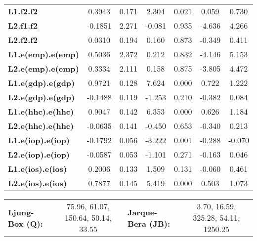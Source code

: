 \begin{center}
\begin{tabular}{lcccccc}
\textbf{L1.f2.f2}         &       0.3943  &        0.171     &     2.304  &         0.021        &        0.059    &        0.730     \\
\textbf{L2.f1.f2}         &      -0.1851  &        2.271     &    -0.081  &         0.935        &       -4.636    &        4.266     \\
\textbf{L2.f2.f2}         &       0.0310  &        0.194     &     0.160  &         0.873        &       -0.349    &        0.411     \\
\textbf{L1.e(emp).e(emp)} &       0.5036  &        2.372     &     0.212  &         0.832        &       -4.146    &        5.153     \\
\textbf{L2.e(emp).e(emp)} &       0.3334  &        2.111     &     0.158  &         0.875        &       -3.805    &        4.472     \\
\textbf{L1.e(gdp).e(gdp)} &       0.9721  &        0.128     &     7.624  &         0.000        &        0.722    &        1.222     \\
\textbf{L2.e(gdp).e(gdp)} &      -0.1488  &        0.119     &    -1.253  &         0.210        &       -0.382    &        0.084     \\
\textbf{L1.e(hhc).e(hhc)} &       0.9047  &        0.142     &     6.353  &         0.000        &        0.626    &        1.184     \\
\textbf{L2.e(hhc).e(hhc)} &      -0.0635  &        0.141     &    -0.450  &         0.653        &       -0.340    &        0.213     \\
\textbf{L1.e(iop).e(iop)} &      -0.1792  &        0.056     &    -3.222  &         0.001        &       -0.288    &       -0.070     \\
\textbf{L2.e(iop).e(iop)} &      -0.0587  &        0.053     &    -1.101  &         0.271        &       -0.163    &        0.046     \\
\textbf{L1.e(ios).e(ios)} &       0.2006  &        0.133     &     1.509  &         0.131        &       -0.060    &        0.461     \\
\textbf{L2.e(ios).e(ios)} &       0.7877  &        0.145     &     5.419  &         0.000        &        0.503    &        1.073     \\
\bottomrule
\end{tabular}
\begin{tabular}{lclc}
\textbf{Ljung-Box (Q):}          & 75.96, 61.07, 150.64, 50.14, 33.55 & \textbf{  Jarque-Bera (JB):  } & 3.70, 16.59, 325.28, 54.11, 1250.25  \\

\end{tabular}
\end{center}
